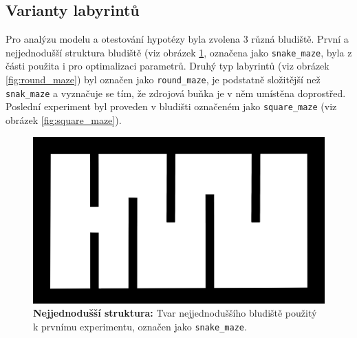 \documentclass[10pt,a4paper,twocolumn]{article}
\begin{document}
\subsection{Varianty labyrintů}
\label{subsec:lab_variants}
Pro analýzu modelu a otestování hypotézy byla zvolena 3 různá bludiště.
První a nejjednodušší struktura bludiště (viz obrázek \ref{fig:snake_maze}, označena jako \texttt{snake\_maze}, byla z části použita i pro optimalizaci parametrů. 
Druhý typ labyrintů (viz obrázek \ref{fig:round_maze}) byl označen jako \texttt{round\_maze}, je podstatně složitější než \texttt{snak\_maze} a vyznačuje se tím, že zdrojová buňka je v něm umístěna doprostřed.
Poslední experiment byl proveden v bludišti označeném jako \texttt{square\_maze} (viz obrázek \ref{fig:square_maze}).


\begin{figure}[tb]
  \centering
  \includegraphics[width=0.98\linewidth]{images/snake_maze.png}
  \caption{\textbf{Nejjednodušší struktura:} 
  Tvar nejjednoduššího bludiště použitý k prvnímu experimentu, označen jako \texttt{snake\_maze}.}
  \label{fig:snake_maze}
\end{figure} 
\end{document}
